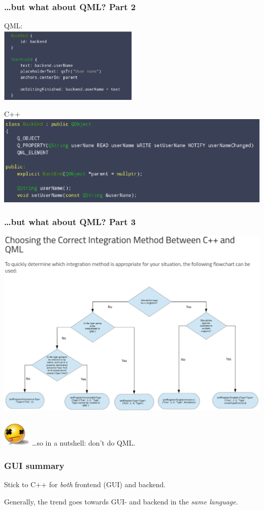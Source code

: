 \documentclass[xcolor=dvipsnames]{beamer}
\begin{document}
\begin{frame}[fragile]
\frametitle{\ldots but what about QML? Part 2}

QML:\\
\mbox{\includegraphics[width=0.5\textwidth]{qml_frontend}}

C++\\
\mbox{\includegraphics[width=\textwidth]{qml_backend}}


\end{frame}




\begin{frame}[fragile]
\frametitle{\ldots but what about QML? Part 3}

\mbox{\includegraphics[width=\textwidth]{qml_choose}}

\mbox{\includegraphics[width=0.1\textwidth]{emoj-dead}} \ldots so in a nutshell: don't do QML.

\end{frame}


\begin{frame}[fragile]
  \frametitle{GUI summary}

  Stick to C++ for \textsl{both} frontend (GUI) and backend.

  \bigskip

  Generally, the trend goes towards GUI- and backend in the
  \textsl{same language}.
\end{frame}
\end{document}
